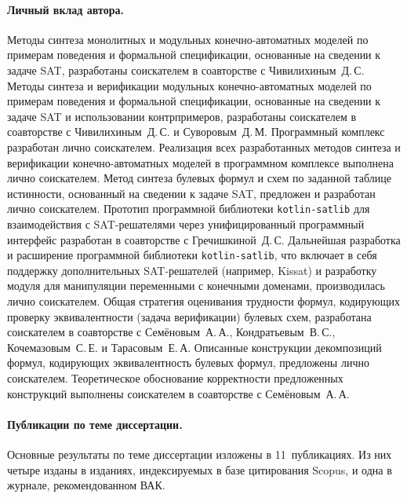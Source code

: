 \paragraph{Личный вклад автора.}
%
Методы синтеза монолитных и модульных конечно-автоматных моделей по примерам поведения и формальной спецификации, основанные на сведении к задаче SAT, разработаны соискателем в соавторстве с Чивилихиным~Д.\,С.
Методы синтеза и верификации модульных конечно-автоматных моделей по примерам поведения и формальной спецификации, основанные на сведении к задаче SAT и использовании контрпримеров, разработаны соискателем в соавторстве с Чивилихиным~Д.\,С. и Суворовым~Д.\,М.
Программный комплекс  разработан лично соискателем.
Реализация всех разработанных методов синтеза и верификации конечно-автоматных моделей в программном комплексе  выполнена лично соискателем.
Метод синтеза булевых формул и схем по заданной таблице истинности, основанный на сведении к задаче SAT, предложен и разработан лично соискателем.
Прототип программной библиотеки \texttt{kotlin-satlib} для взаимодействия с SAT-решателями через унифицированный программный интерфейс разработан в соавторстве с Гречишкиной~Д.\,С.
Дальнейшая разработка и расширение программной библиотеки \texttt{kotlin-satlib}, что включает в себя поддержку дополнительных SAT-решателей (например, Kissat) и разработку модуля для манипуляции переменными с конечными доменами, производилась лично соискателем.
Общая стратегия оценивания трудности формул, кодирующих проверку эквивалентности (задача верификации) булевых схем, разработана соискателем в соавторстве с Семёновым~А.\,А., Кондратьевым~В.\,С., Кочемазовым~С.\,Е. и Тарасовым~Е.\,А.
Описанные конструкции декомпозиций формул, кодирующих эквивалентность булевых формул, предложены лично соискателем.
Теоретическое обоснование корректности предложенных конструкций выполнены соискателем в соавторстве с Семёновым~А.\,А.


%
%
\paragraph{Публикации по теме диссертации.}
%
%
Основные результаты по теме диссертации изложены в 11~публикациях.
Из них четыре изданы в изданиях, индексируемых в базе цитирования Scopus, и одна в журнале, рекомендованном ВАК.


%
%
